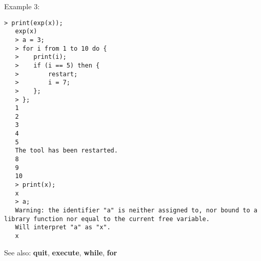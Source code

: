 \noindent Example 3: 
\begin{center}\begin{minipage}{14.8cm}\begin{Verbatim}[frame=single]
   > print(exp(x));
   exp(x)
   > a = 3;
   > for i from 1 to 10 do {
   > 	print(i);
   > 	if (i == 5) then {
   > 		restart;
   > 		i = 7;
   > 	};
   > };
   1
   2
   3
   4
   5
   The tool has been restarted.
   8
   9
   10
   > print(x);
   x
   > a;
   Warning: the identifier "a" is neither assigned to, nor bound to a library function nor equal to the current free variable.
   Will interpret "a" as "x".
   x
\end{Verbatim}
\end{minipage}\end{center}
See also: \textbf{quit}, \textbf{execute}, \textbf{while}, \textbf{for}
